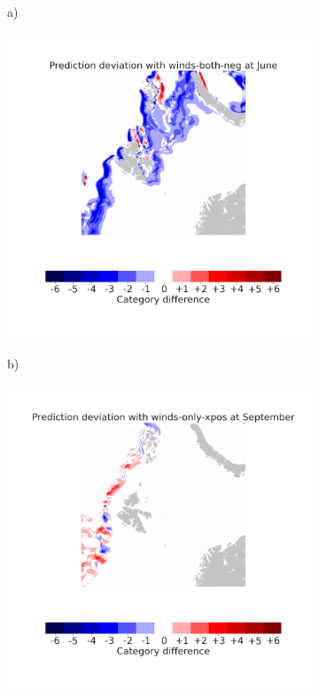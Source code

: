\documentclass[../main/thesis.tex]{subfiles}
\begin{document}
\begin{figure}
    \centering
    \begin{subfigure}[t]{.03\textwidth}
        a)
    \end{subfigure}
    \begin{subfigure}[t]{.455\textwidth}
        \includegraphics[width=\textwidth, valign=t]{bias_winds-both-neg}
    \end{subfigure}
    \begin{subfigure}[t]{.03\textwidth}
        b)
    \end{subfigure}
    \begin{subfigure}[t]{.455\textwidth}
        \includegraphics[width=\textwidth, valign=t]{bias_winds-only-xpos}

\end{subfigure}
\end{figure}
\end{document}
